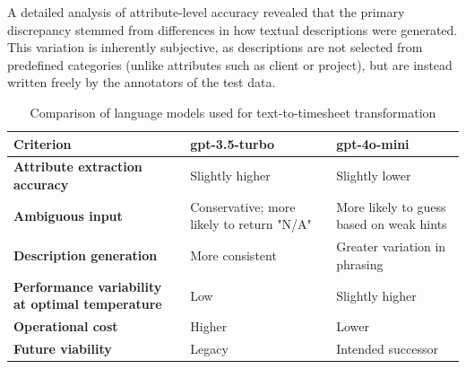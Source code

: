 \documentclass[
  digital,     %
  oneside,     %
  nosansbold,  %
  nocolorbold, %
  lof,         %
  lot,         %
]{fithesis4}
\begin{document}
\begin{markdown}
A detailed analysis of attribute-level accuracy revealed that the primary discrepancy stemmed from differences in how textual descriptions were generated. This variation is inherently subjective, as descriptions are not selected from predefined categories (unlike attributes such as client or project), but are instead written freely by the annotators of the test data.

\end{markdown}
\shorthandon{-}

\begin{table}[h]
\centering
\begin{tabularx}{\textwidth}{|X|X|X|}
\hline
\textbf{Criterion} & \textbf{gpt-3.5-turbo} & \textbf{gpt-4o-mini} \\
\hline
\textbf{Attribute extraction accuracy} & Slightly higher & Slightly lower \\
\hline
\textbf{Ambiguous input} & Conservative; more likely to return "N/A" & More likely to guess based on weak hints \\
\hline
\textbf{Description generation} & More consistent & Greater variation in phrasing \\
\hline
\textbf{Performance variability at optimal temperature} & Low & Slightly higher \\
\hline
\textbf{Operational cost} & Higher & Lower \\
\hline
\textbf{Future viability} & Legacy & Intended successor \\
\hline
\end{tabularx}
\caption{Comparison of language models used for text-to-timesheet transformation}
\label{tab:text_to_timesheet_models}
\end{table}
\end{document}
